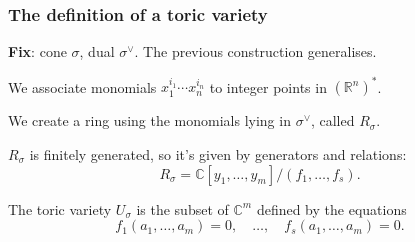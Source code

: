 \documentclass{beamer}
\theoremstyle{definition}
\theoremstyle{definition}
\begin{document}
\begin{frame}
\frametitle{The definition of a toric variety}
\textbf{Fix}: cone $\sigma$, dual $\sigma^\vee$. 
The previous construction generalises.

\pause
We associate monomials $x_1^{i_1} \cdots x_n^{i_n}$ to integer points in $(\mathbb{R}^n)^*$.

\pause
We create a ring using the monomials lying in $\sigma^\vee$, called $R_\sigma$.

\pause
$R_\sigma$ is finitely generated, so it's given by generators and relations:
$$R_\sigma = \mathbb{C}[y_1, \ldots, y_m]/(f_1, \ldots, f_s).$$

\pause
The \alert{toric variety} $U_\sigma$ is the subset of $\mathbb{C}^m$ defined by the equations
$$f_1(a_1, \ldots, a_m) = 0, \quad \ldots, \quad  f_s(a_1, \ldots, a_m) = 0.$$
\end{frame}
\end{document}
